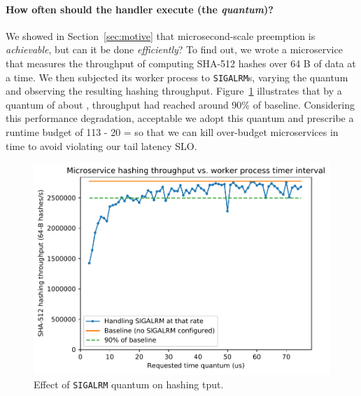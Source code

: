\paragraph{How often should the handler execute (the \emph{quantum})?}
We showed in Section~\ref{sec:motive} that microsecond-scale preemption is
\textit{achievable}, but can it be done \textit{efficiently}?  To find out, we wrote
a microservice that measures the throughput of computing SHA-512 hashes over 64 B of
data at a time.  We then subjected its worker process to \texttt{SIGALRM}s, varying
the quantum and observing the resulting hashing throughput.
Figure~\ref{fig:hashtput} illustrates that by a quantum of about , throughput
had reached around 90\% of baseline.  Considering this performance degradation,
acceptable we adopt this quantum and prescribe a runtime budget of 113 - 20 = 
so that we can kill over-budget microservices in time to avoid violating our tail
latency SLO.

\begin{figure}
\includegraphics[width=\columnwidth]{figs/2018-02-02-evaluation_quantum-hasher_throughput-throughput}
\caption{Effect of \texttt{SIGALRM} quantum on hashing tput.}
\label{fig:hashtput}
\end{figure}
